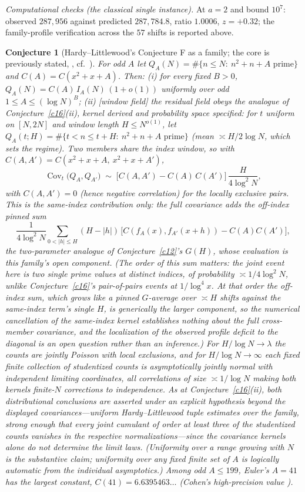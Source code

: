 \documentclass[11pt]{article}
\newtheorem{conjecture}{Conjecture}
\theoremstyle{definition}
\begin{document}
\emph{Computational checks (the classical single instance).}  At $a=2$ and
bound $10^{7}$: observed $287{,}956$ against predicted $287{,}784.8$,
ratio $1.0006$, $z=+0.32$; the family-profile verification across the
$57$ shifts is reported above.

\setcounter{conjecture}{15}%
\begin{conjecture}[Hardy--Littlewood's Conjecture F as a family; the core is previously
stated, \cite{HL1923}, cf.~\cite{JW}]\label{c24}
For odd $A$ let $Q_A(N)=\#\{n\le N:\ n^2+n+A \text{ prime}\}$ and
$C(A)=C(x^2+x+A)$.  Then: \emph{(i)} for every fixed $B>0$, $Q_A(N)=C(A)\,I_A(N)\,(1+o(1))$ uniformly over odd $1\le A\le(\log N)^B$; \emph{(ii)} [window field] the residual field obeys the analogue of Conjecture~\ref{c16}(ii), kernel derived and probability space specified: for $t$ uniform on $[N,2N]$ and window length $H\le
N^{o(1)}$, let
$Q_A(t;H)=\#\{t<n\le t+H:\ n^2+n+A \text{ prime}\}$ (mean
${\asymp}H/2\log N$, which sets the regime).  Two members share the
index window, so with $C(A,A')=C(x^2+x+A,\ x^2+x+A')$,
\[
\operatorname{Cov}_t\bigl(Q_A,Q_{A'}\bigr)\;\sim\;
\bigl[C(A,A')-C(A)\,C(A')\bigr]\,\frac{H}{4\log^2N},
\]
with $C(A,A')=0$ (hence \emph{negative} correlation) for the locally
exclusive pairs.  This is the \emph{same-index} contribution only: the full
covariance adds the off-index pinned sum
\[
\frac1{4\log^2N}\sum_{0<|h|\le H}(H-|h|)\,
\bigl[C(f_A(x),f_{A'}(x+h))-C(A)C(A')\bigr],
\]
the two-parameter analogue of
Conjecture~\ref{c12}'s $G(H)$, whose evaluation is this family's
open component.  (The order of this sum matters: the joint event here is
\emph{two single prime values} at
distinct indices, of probability $\asymp1/4\log^2N$, unlike
Conjecture~\ref{c16}'s pair-of-pairs events at $1/\log^4x$.  At that
order the off-index sum, which grows like a pinned
$G$-average over $\asymp H$ shifts against the same-index term's
single $H$, is generically the \emph{larger} component, so the
numerical cancellation of the same-index kernel establishes nothing
about the full cross-member covariance, and the localization of the
observed profile deficit to the diagonal is an open question rather
than an inference.)  For $H/\log N\to\lambda$ the counts are jointly
Poisson with local exclusions, and for $H/\log N\to\infty$ each
fixed finite collection of studentized counts is asymptotically
jointly normal with independent limiting coordinates, all
correlations of size $\asymp1/\log N$ making
both kernels finite-$N$ corrections to independence.  As at
Conjecture~\ref{c16}(ii), both distributional conclusions are
asserted under an explicit hypothesis beyond the displayed
covariances---uniform Hardy--Littlewood tuple estimates over the
family, strong enough that every joint cumulant of order at least
three of the studentized counts vanishes in the respective
normalizations---since the covariance kernels alone do not
determine the limit laws.
(Uniformity over a range growing with $N$ is the substantive claim;
uniformity over any \emph{fixed} finite set of $A$ is logically
automatic from the individual asymptotics.)  Among
odd $A\le199$, Euler's $A=41$ has the largest constant,
$C(41)=6.6395463\ldots$ (Cohen's high-precision value \cite{Cohen}).
\end{conjecture}
\end{document}
